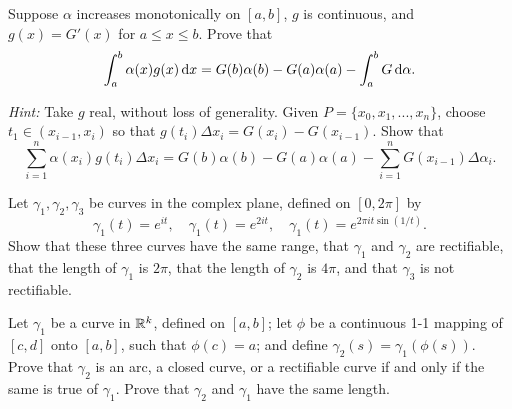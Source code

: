 \begin{myexercise}
    \label{ex:6.17}
    Suppose $\alpha$ increases monotonically on $[a, b]$, 
    $g$ is continuous, and $g(x) = G'(x)$ 
    for $a \leq x \leq b$. 
    Prove that
    \begin{equation*}
        \int_{a}^{b} \alpha(x) g(x) \d x =
        G(b)\alpha(b) - G(a)\alpha(a) - \int_{a}^{b}G \d \alpha .
    \end{equation*}

    \emph{Hint:} Take $g$ real, without loss of generality.
    Given $P = \{x_0,x_1,...,x_n\}$, choose $t_1 \in (x_{i-1},x_i)$ so that $g(t_i)\Delta x_i = G(x_i) - G(x_{i-1})$.
    Show that 
    \begin{equation*}
        \sum_{i=1}^{n} \alpha(x_i) g(t_i) \Delta x_i =
        G(b)\alpha(b) - G(a)\alpha(a) - \sum_{i=1}^{n}G(x_{i-1}) \Delta \alpha_i .
    \end{equation*}
\end{myexercise}


\begin{myexercise}
    \label{ex:6.18}
    Let $\gamma_1, \gamma_2, \gamma_3$ be curves in the complex plane, defined on $[0, 2\pi]$ by
    \begin{equation*}
        \gamma_1(t) = e^{it} , \quad
        \gamma_1(t) = e^{2it} , \quad
        \gamma_1(t) = e^{2\pi it \sin (1/t)} .
    \end{equation*}
    Show that these three curves have the same range, 
    that $\gamma_1$ and $\gamma_2$ are rectifiable, 
    that the length of $\gamma_1$ is $2\pi$, 
    that the length of $\gamma_2$ is $4\pi$, 
    and that $\gamma_3$ is not rectifiable.
\end{myexercise}


\begin{myexercise}
    \label{ex:6.19}
    Let $\gamma_1$ be a curve in ${\protect\mathbb R}^k$, defined on $[a, b]$; 
    let $\phi$ be a continuous 1-1 mapping of $[c, d]$ onto $[a, b]$, such that $\phi(c) = a$; 
    and define $\gamma_2(s) = \gamma_1(\phi(s))$. 
    Prove that $\gamma_2$ is an arc, a closed curve, or a rectifiable curve if and only if the same is true of $\gamma_1$.
    Prove that $\gamma_2$ and $\gamma_1$ have the same length.
\end{myexercise}
